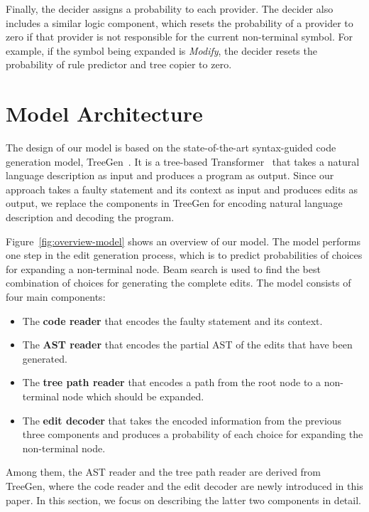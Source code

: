Finally, the decider assigns a probability to each provider. The decider also includes a similar logic component, which resets the probability of a provider to zero if that provider is not responsible for the current non-terminal symbol. For example, if the symbol being expanded is \textit{Modify}, the decider resets the probability of rule predictor and tree copier to zero.

\vspace{-3mm}
\section{Model Architecture}
The design of our model is based on the state-of-the-art syntax-guided code generation model, TreeGen~\cite{treegen}. It is a tree-based Transformer~\cite{transformer} that takes a natural language description as input and produces a program as output. Since our approach takes a faulty statement and its context as input and produces edits as output, we replace the components in TreeGen for encoding natural language description and decoding the program.

Figure~\ref{fig:overview-model} shows an overview of our model. The model performs one step in the edit generation process, which is to predict probabilities of choices for expanding a non-terminal node. Beam search is used to find the best combination of choices for generating the complete edits. The model consists of four main components: 
\begin{itemize}
    \item The {\bf code reader} that encodes the faulty statement and its context.
    \item The {\bf AST reader} that encodes the partial AST of the edits that have been generated.
    \item The {\bf tree path reader} that encodes a path from the root node to a non-terminal node which should be expanded.
    \item The {\bf edit decoder} that takes the encoded information from the previous three components and produces a probability of each choice for expanding the non-terminal node.
\end{itemize}
Among them, the AST reader and the tree path reader are derived from TreeGen, where the code reader and the edit decoder are newly introduced in this paper. In this section, we focus on describing the latter two components in detail. %

